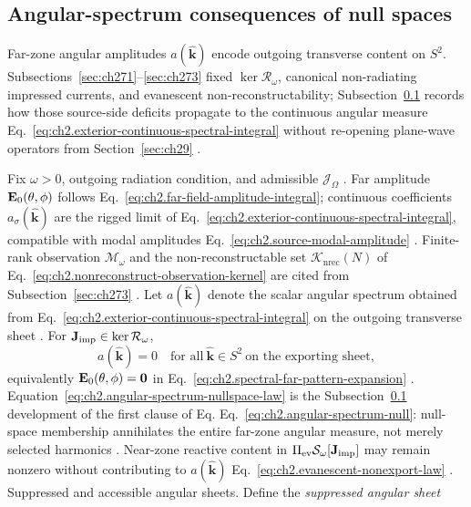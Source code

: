 \subsection{Angular-spectrum consequences of null spaces}
\label{sec:ch274}
Far-zone angular amplitudes $a(\widehat{\mathbf{k}})$ encode outgoing transverse content on
$S^{2}$. Subsections~\ref{sec:ch271}--\ref{sec:ch273} fixed
$\ker\mathcal{R}_\omega$, canonical non-radiating impressed currents, and evanescent
non-reconstructability; Subsection~\ref{sec:ch274} records how those source-side deficits
propagate to the continuous angular measure
Eq.~\eqref{eq:ch2.exterior-continuous-spectral-integral} without re-opening plane-wave operators
from Section~\ref{sec:ch29} \cite{stratton1941}.

Fix $\omega>0$, outgoing radiation condition, and admissible $\mathcal{J}_\Omega$
\cite{stratton1941}. Far amplitude $\mathbf{E}_0(\theta,\phi)$ follows
Eq.~\eqref{eq:ch2.far-field-amplitude-integral}; continuous coefficients
$a_\sigma(\widehat{\mathbf{k}})$ are the rigged limit of
Eq.~\eqref{eq:ch2.exterior-continuous-spectral-integral}, compatible with modal amplitudes
Eq.~\eqref{eq:ch2.source-modal-amplitude} \cite{stratton1941}. Finite-rank observation
$\mathcal{M}_\omega$ and the non-reconstructable set
$\mathcal{K}_{\mathrm{nrec}}(N)$ of Eq.~\eqref{eq:ch2.nonreconstruct-observation-kernel} are
cited from Subsection~\ref{sec:ch273} \cite{harrington2001}.
Let $a(\widehat{\mathbf{k}})$ denote the scalar angular spectrum obtained from
Eq.~\eqref{eq:ch2.exterior-continuous-spectral-integral} on the outgoing transverse sheet
\cite{stratton1941}. For \(\mathbf{J}_{\mathrm{imp}}\in\ker\mathcal{R}_\omega\),
\begin{equation}
\label{eq:ch2.angular-spectrum-nullspace-law}
a(\widehat{\mathbf{k}})=0
\quad\text{for all}\ \widehat{\mathbf{k}}\in S^{2}
\ \text{on the exporting sheet},
\end{equation}
equivalently \(\mathbf{E}_0(\theta,\phi)=\mathbf{0}\) in Eq.~\eqref{eq:ch2.spectral-far-pattern-expansion}
\cite{stratton1941}. Equation~\eqref{eq:ch2.angular-spectrum-nullspace-law} is the
Subsection~\ref{sec:ch274} development of the first clause of Eq.
Eq.~\eqref{eq:ch2.angular-spectrum-null}: null-space membership annihilates the entire
far-zone angular measure, not merely selected harmonics
\cite{harrington2001}. Near-zone reactive content in
\(\Pi_{\mathrm{ev}}\mathcal{S}_\omega[\mathbf{J}_{\mathrm{imp}}]\) may remain nonzero without contributing to
\(a(\widehat{\mathbf{k}})\) Eq.~\eqref{eq:ch2.evanescent-nonexport-law}
\cite{stratton1941}.
Suppressed and accessible angular sheets. Define the \emph{suppressed angular sheet}
